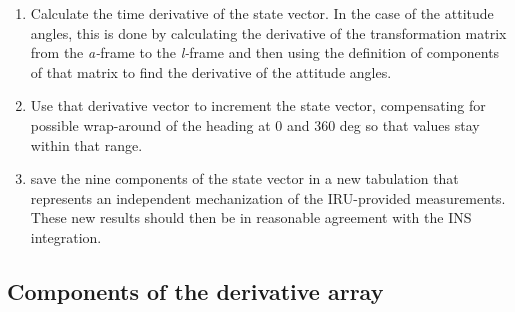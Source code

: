 \documentclass[12pt,twoside,english,12pt,twoside,english]{article}\usepackage[]{graphicx}\usepackage[]{color}
\let\OrgIndex\index
\renewcommand*{\index}[1]{\OrgIndex{#1}}
\begin{document}
\begin{enumerate}
\begin{enumerate}
\item Calculate the time derivative of the state vector.
 In the case of the attitude angles,
this is done by calculating the derivative
of the transformation matrix
from the \emph{a-}frame
to the \emph{l-}frame
and then using the definition of components of that matrix to find
the derivative of the attitude angles.
\item Use that derivative vector  to increment
the state vector, compensating for possible wrap-around of the heading
at 0 and 360 deg so that values stay within that range.
\item save the nine components of the state vector
in a new tabulation that represents an independent mechanization
of the IRU-provided measurements. These
new results should then be in reasonable agreement with the INS integration.
\end{enumerate}
\end{enumerate}

\subsection{Components of the derivative array\label{subsec:deriv-array}}
\end{document}
